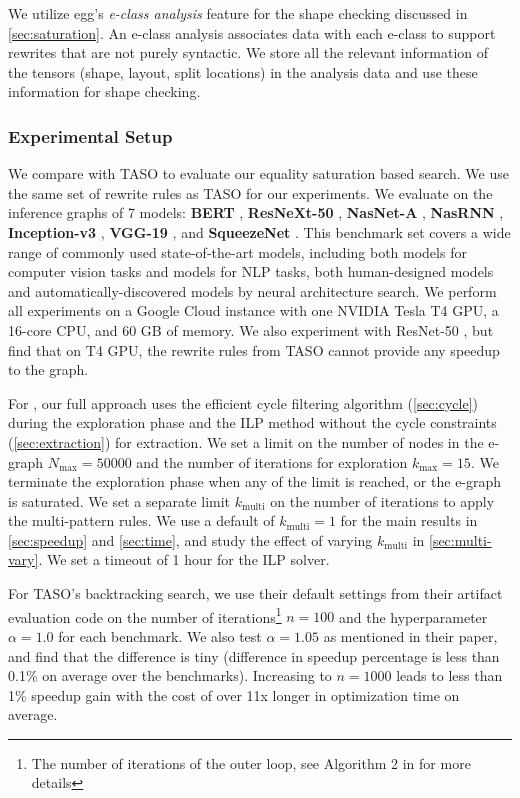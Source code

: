 We utilize egg's \textit{e-class analysis} feature for the shape checking discussed in \autoref{sec:saturation}.
An e-class analysis associates data with each e-class to support rewrites that are not purely syntactic.
We store all the relevant information of the tensors (shape, layout, split locations) in the analysis data and use these information for shape checking.

\subsubsection{Experimental Setup}

We compare \ourname{} with TASO \cite{taso} to evaluate our equality saturation based search.
We use the same set of rewrite rules as TASO for our experiments.
We evaluate on the inference graphs of 7 models:
\textbf{BERT} \cite{bert}, \textbf{ResNeXt-50} \cite{resnext50}, \textbf{NasNet-A} \cite{nasneta}, \textbf{NasRNN} \cite{nasrnn}, \textbf{Inception-v3} \cite{inceptionv3},
\textbf{VGG-19} \cite{vgg}, and \textbf{SqueezeNet} \cite{squeezenet}.
This benchmark set covers a wide range of commonly used state-of-the-art models, including both models for computer vision tasks and models for NLP tasks, both human-designed models and automatically-discovered models by neural architecture search.
We perform all experiments on a Google Cloud instance with one NVIDIA Tesla T4 GPU, a 16-core CPU, and 60 GB of memory.
We also experiment with ResNet-50 \cite{resnet}, but find that on T4 GPU, the rewrite rules from TASO cannot provide any speedup to the graph.

For \ourname{}, our full approach uses the efficient cycle filtering algorithm (\autoref{sec:cycle}) during the exploration phase and the ILP method without the cycle constraints (\autoref{sec:extraction}) for extraction.
We set a limit on the number of nodes in the e-graph $N_{\textrm{max}}=50000$ and the number of iterations for exploration $k_{\textrm{max}}=15$.
We terminate the exploration phase when any of the limit is reached, or the e-graph is saturated.
We set a separate limit $k_{\textrm{multi}}$ on the number of iterations to apply the multi-pattern rules.
We use a default of $k_{\textrm{multi}}=1$ for the main results in \autoref{sec:speedup} and \autoref{sec:time}, and study the effect of varying $k_{\textrm{multi}}$ in \autoref{sec:multi-vary}.
We set a timeout of 1 hour for the ILP solver.

For TASO's backtracking search, we use their default settings from their artifact evaluation code on the number of iterations\footnote{The number of iterations of the outer loop, see Algorithm 2 in \cite{taso} for more details} $n=100$ and the hyperparameter $\alpha=1.0$ for each benchmark.
We also test $\alpha=1.05$ as mentioned in their paper, and find that the difference is tiny (difference in speedup percentage is less than 0.1\% on average over the benchmarks).
Increasing to $n=1000$ leads to less than 1\% speedup gain with the cost of over 11x longer in optimization time on average.


